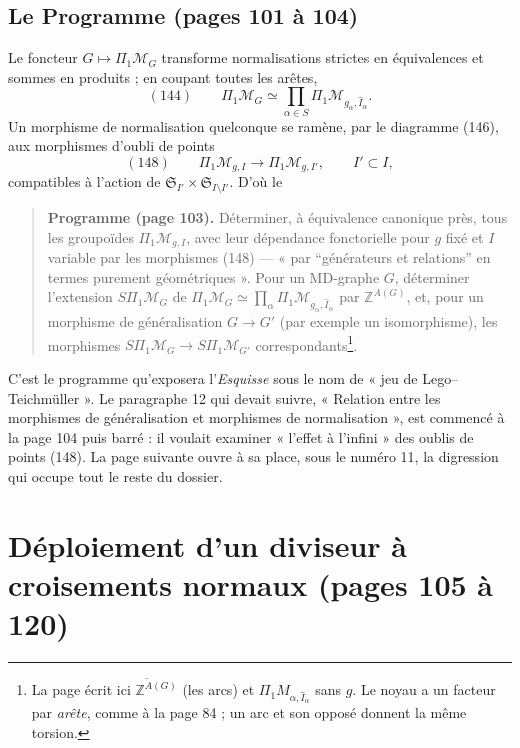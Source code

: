 \documentclass[11pt,a4paper]{article}
\begin{document}
\subsection*{Le Programme (pages 101 à 104)}

Le foncteur $G \mapsto \Pi_1\mathcal{M}_G$ transforme normalisations strictes en
équivalences et sommes en produits ; en coupant toutes les arêtes,
\[
(144) \qquad \Pi_1\mathcal{M}_G \simeq \prod_{\alpha \in S}
\Pi_1\mathcal{M}_{g_\alpha, \widehat{I}_\alpha} .
\]
Un morphisme de normalisation quelconque se ramène, par le diagramme (146), aux
morphismes d'oubli de points
\[
(148) \qquad \Pi_1\mathcal{M}_{g,I} \longrightarrow \Pi_1\mathcal{M}_{g,I'},
\qquad I' \subset I,
\]
compatibles à l'action de $\mathfrak{S}_{I'} \times \mathfrak{S}_{I \setminus I'}$.
D'où le

\begin{quote}
\textbf{Programme (page 103).} Déterminer, à équivalence canonique près, tous les
groupoïdes $\Pi_1\mathcal{M}_{g,I}$, avec leur dépendance fonctorielle pour $g$
fixé et $I$ variable par les morphismes (148) — « par “générateurs et relations”
en termes purement géométriques ». Pour un MD-graphe $G$, déterminer l'extension
$S\Pi_1\mathcal{M}_G$ de $\Pi_1\mathcal{M}_G \simeq \prod_\alpha
\Pi_1\mathcal{M}_{g_\alpha, \widehat{I}_\alpha}$ par $\mathbb{Z}^{A(G)}$, et, pour
un morphisme de généralisation $G \to G'$ (par exemple un isomorphisme), les
morphismes $S\Pi_1\mathcal{M}_G \to S\Pi_1\mathcal{M}_{G'}$
correspondants\footnote{La page écrit ici $\mathbb{Z}^{\widetilde{A}(G)}$ (les arcs)
et $\Pi_1 M_{\alpha, \widehat{I}_\alpha}$ sans $g$. Le noyau a un facteur par
\emph{arête}, comme à la page 84 ; un arc et son opposé donnent la même torsion.}.
\end{quote}

C'est le programme qu'exposera l'\emph{Esquisse} sous le nom de « jeu de
Lego--Teichmüller ». Le paragraphe 12 qui devait suivre, « Relation entre les
morphismes de généralisation et morphismes de normalisation », est commencé à la
page 104 puis barré : il voulait examiner « l'effet à l'infini » des oublis de
points (148). La page suivante ouvre à sa place, sous le numéro 11, la
digression qui occupe tout le reste du dossier.

\section*{Déploiement d'un diviseur à croisements normaux (pages 105 à 120)}
\end{document}
